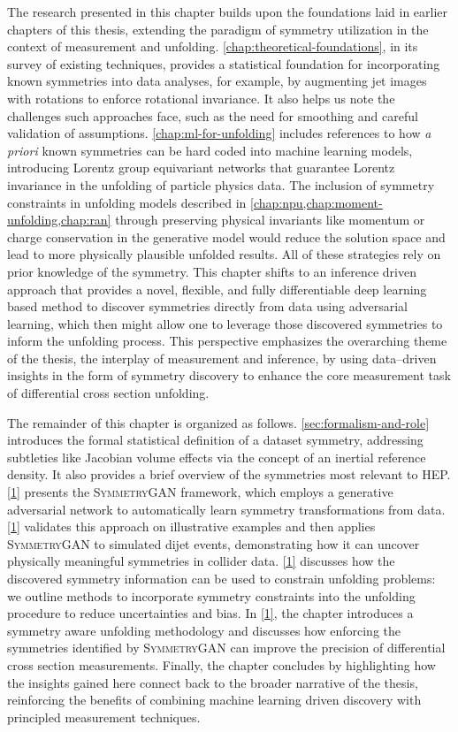     The research presented in this chapter builds upon the foundations laid in earlier chapters of this thesis, extending the paradigm of symmetry utilization in the context of measurement and unfolding.
    \cref{chap:theoretical-foundations}, in its survey of existing techniques, provides a statistical foundation for incorporating known symmetries into data analyses, for example, by augmenting jet images with rotations to enforce rotational invariance.
    It also helps us note the challenges such approaches face, such as the need for smoothing and careful validation of assumptions.
    \cref{chap:ml-for-unfolding} includes references to how \textit{a priori} known symmetries can be hard coded into machine learning models, introducing Lorentz group equivariant networks that guarantee Lorentz invariance in the unfolding of particle physics data.
    The inclusion of symmetry constraints in unfolding models described in \cref{chap:npu,chap:moment-unfolding,chap:ran} through preserving physical invariants like momentum or charge conservation in the generative model would reduce the solution space and lead to more physically plausible unfolded results.
    All of these strategies rely on prior knowledge of the symmetry.
    This chapter shifts to an inference driven approach that provides a novel, flexible, and fully differentiable deep learning based method to discover symmetries directly from data using adversarial learning, which then might allow one to leverage those discovered symmetries to inform the unfolding process.
    This perspective emphasizes the overarching theme of the thesis, the interplay of measurement and inference, by using data--driven insights in the form of symmetry discovery to enhance the core measurement task of differential cross section unfolding.

    The remainder of this chapter is organized as follows.
    \cref{sec:formalism-and-role} introduces the formal statistical definition of a dataset symmetry, addressing subtleties like Jacobian volume effects via the concept of an inertial reference density.
    It also provides a brief overview of the symmetries most relevant to HEP.
    \cref{1} presents the \textsc{SymmetryGAN} framework, which employs a generative adversarial network to automatically learn symmetry transformations from data.
    \cref{1} validates this approach on illustrative examples and then applies \textsc{SymmetryGAN} to simulated dijet events, demonstrating how it can uncover physically meaningful symmetries in collider data.
    \cref{1} discusses how the discovered symmetry information can be used to constrain unfolding problems: we outline methods to incorporate symmetry constraints into the unfolding procedure to reduce uncertainties and bias.
    In \cref{1}, the chapter introduces a symmetry aware unfolding methodology and discusses how enforcing the symmetries identified by \textsc{SymmetryGAN} can improve the precision of differential cross section measurements.
    Finally, the chapter concludes by highlighting how the insights gained here connect back to the broader narrative of the thesis, reinforcing the benefits of combining machine learning driven discovery with principled measurement techniques.

